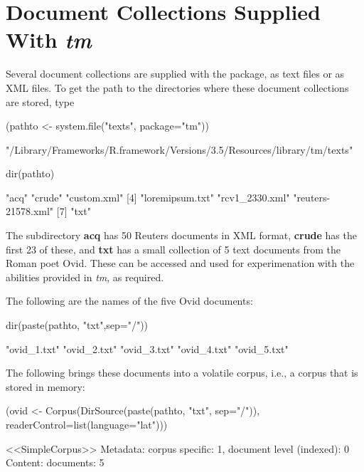 \section{Document Collections Supplied With {\em tm}}
Several document collections are supplied with the package,
as text files or as XML files.  To get the path to the
directories where these document collections are stored, type
\begin{fullwidth}

\begin{Schunk}
\begin{Sinput}
(pathto <- system.file("texts", package="tm"))
\end{Sinput}
\begin{Soutput}
[1] "/Library/Frameworks/R.framework/Versions/3.5/Resources/library/tm/texts"
\end{Soutput}
\begin{Sinput}
dir(pathto)
\end{Sinput}
\begin{Soutput}
[1] "acq"               "crude"             "custom.xml"       
[4] "loremipsum.txt"    "rcv1_2330.xml"     "reuters-21578.xml"
[7] "txt"              
\end{Soutput}
\end{Schunk}

\end{fullwidth}
The subdirectory \textbf{acq} has 50 Reuters documents in XML format,
\textbf{crude} has the first 23 of these, and \textbf{txt} has a
small collection of 5 text documents from the Roman poet Ovid.
These can be accessed and used for experimenation with the abilities
provided in {\em tm}, as required.

The following are the names of the five Ovid documents:
\begin{fullwidth}

\begin{Schunk}
\begin{Sinput}
dir(paste(pathto, "txt",sep="/"))
\end{Sinput}
\begin{Soutput}
[1] "ovid_1.txt" "ovid_2.txt" "ovid_3.txt" "ovid_4.txt" "ovid_5.txt"
\end{Soutput}
\end{Schunk}

\end{fullwidth}

The following brings these documents into a volatile corpus, i.e.,
a corpus that is stored in memory:
\begin{Schunk}
\begin{Sinput}
(ovid <-
   Corpus(DirSource(paste(pathto, "txt", sep="/")),
          readerControl=list(language="lat")))
\end{Sinput}
\begin{Soutput}
<<SimpleCorpus>>
Metadata:  corpus specific: 1, document level (indexed): 0
Content:  documents: 5
\end{Soutput}
\end{Schunk}

